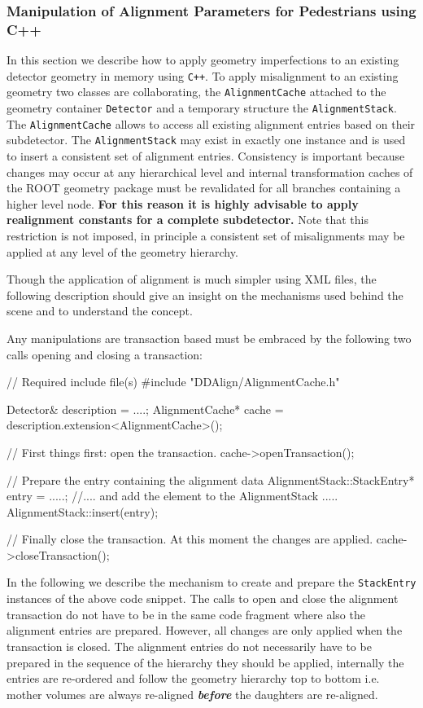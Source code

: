 \documentclass[10pt,a4paper]{article}
\begin{document}
\noindent
\subsubsection{Manipulation of Alignment Parameters for Pedestrians using C++}
\label{sec:ddalign-user-manual-misalignment-manip-cxx}
\noindent
In this section we describe how to apply geometry imperfections to an existing 
detector geometry in memory using {\tt C++}. To apply misalignment to an existing
geometry two classes are collaborating, the {\tt AlignmentCache} attached to
the geometry container {\tt Detector} and a temporary structure the {\tt AlignmentStack}.
The {\tt AlignmentCache} allows to access all existing alignment entries 
based on their subdetector.
The {\tt AlignmentStack} may exist in exactly one instance and is used to
insert a consistent set of alignment entries. Consistency is important because
changes may occur at any hierarchical level and internal transformation caches
of the ROOT geometry package must be revalidated for all branches containing
a higher level node.
{\bf For this reason it is highly advisable to apply realignment constants 
for a complete subdetector.}
Note that this restriction is not imposed, in principle a consistent set 
of misalignments may be applied at any level of the geometry hierarchy.

\noindent
Though the application of alignment is much simpler using XML files, the following
description should give an insight on the mechanisms used behind the scene and
to understand the concept.

\noindent
Any manipulations are transaction based must be embraced by the following two calls
opening and closing a transaction:
\begin{code}
// Required include file(s)
#include "DDAlign/AlignmentCache.h"

    Detector& description = ....;
    AlignmentCache* cache = description.extension<AlignmentCache>();

    // First things first: open the transaction.
    cache->openTransaction();

    // Prepare the entry containing the alignment data
    AlignmentStack::StackEntry* entry =  .....;
    //.... and add the element to the AlignmentStack .....
    AlignmentStack::insert(entry);

    // Finally close the transaction. At this moment the changes are applied.
    cache->closeTransaction();
\end{code}
In the following we describe the mechanism to create and prepare the 
{\tt StackEntry} instances of the above code snippet. The calls to open and close
the alignment transaction do not have to be in the same code fragment where also
the alignment entries are prepared. However, all changes are only applied when 
the transaction is closed. The alignment entries do not necessarily have to 
be prepared in the sequence of the hierarchy they should be applied, internally
the entries are re-ordered and follow the geometry hierarchy top to bottom
i.e. mother volumes are always re-aligned {\it\bf before} the daughters 
are re-aligned.
\end{document}

